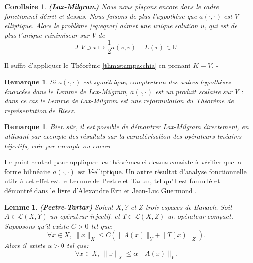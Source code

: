 \documentclass[11pt]{book}
\newtheorem{lemma}[theorem]{Lemme}
\newtheorem{corollary}[theorem]{Corollaire}
\newtheorem{remark}[theorem]{Remarque}
\newcommand{\be}{\begin{equation}}
\newcommand{\ee}{\end{equation}}
\newcommand{\br}{\begin{remark}}
\newcommand{\er}{\end{remark}}
\newcommand{\bc}{\begin{corollary}}
\newcommand{\ec}{\end{corollary}}
\newcommand{\bl}{\begin{lemma}}
\newcommand{\el}{\end{lemma}}
\newcommand{\cqfd}{{$\mbox{}$\hfill$\square$}}
\newcommand{\R}{\mathbb{R}}
\begin{document}
\bc \label{cor:laxmilgram} {\bf (Lax-Milgram)} Nous nous plaçons encore dans le cadre fonctionnel décrit ci-dessus. Nous faisons de plus l'hypothèse que $a(\cdot,\cdot)$ est $V$-elliptique. Alors le problème \eqref{eq:eqvar} admet une unique solution $u$, qui est de plus l'unique minimiseur sur $V$ de 
\[
J : V\ni v \mapsto \frac12 a(v,v) - L(v) \in \R. 
\]
\ec

\proof Il suffit d'appliquer le Théorème \ref{thm:stampacchia} en prenant $K=V$. \cqfd

\br
Si $a(\cdot,\cdot)$ est symétrique, compte-tenu des autres hypothèses énoncées dans le Lemme de Lax-Milgram, $a(\cdot,\cdot)$ est un produit scalaire sur $V$ : dans ce cas le Lemme de Lax-Milgram est une reformulation du Théorème de représentation de Riesz.
\er

\br
Bien sûr, il est possible de démontrer Lax-Milgram directement, en utilisant par exemple des résultats sur la caractérisation des opérateurs linéaires bijectifs, voir par exemple \cite[Théorème 3.3.1]{allaire-2007} ou encore \cite[Corollary A.50]{ern-guermond-04}.
\er

Le point central pour appliquer les théorèmes ci-dessus consiste à vérifier que la forme bilinéaire $a(\cdot,\cdot)$ est $V$-elliptique. Un autre résultat d'analyse fonctionnelle utile à cet effet est le Lemme de Peetre et Tartar,
tel qu'il est formulé et démontré dans le livre d'Alexandre Ern et Jean-Luc Guermond \cite[Lemma A.38, p.469]{ern-guermond-04}. %
 \bl {(\bf Peetre-Tartar)}
 \label{lemme:peetre-tartar}
 Soient $X,Y$ et $Z$ trois espaces de Banach. Soit $A \in \mathcal{L} (X, Y)$ un opérateur injectif, et $T \in \mathcal{L} ( X , Z)$ un opérateur compact. Supposons qu'il existe $C > 0$ tel que:
 \be
 \label{eq:petree-tartar1}
 \forall x \in X,\: \| x \|_{X} \leq C \left ( \| A(x) \|_{Y} + \| T(x) \|_{Z} \right ).
 \ee
 Alors il existe $\alpha > 0$ tel que:
 \be
 \label{eq:petree-tartar2}
 \forall x \in X,\: \| x \|_{X} \leq \alpha \| A(x) \|_{Y}.
 \ee
 \el
\end{document}

